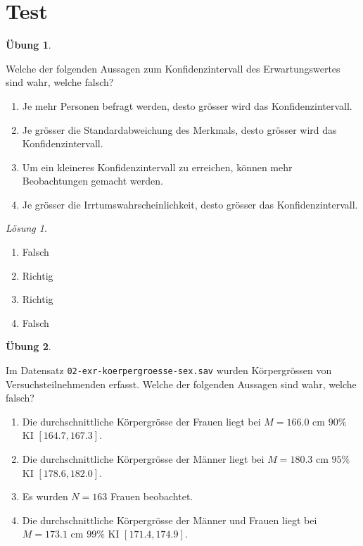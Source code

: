 \documentclass[
]{book}
\providecommand{\tightlist}{%
  \setlength{\itemsep}{0pt}\setlength{\parskip}{0pt}}
\theoremstyle{definition}
\theoremstyle{definition}
\theoremstyle{definition}
\newtheorem{exercise}{Übung}[chapter]
\theoremstyle{definition}
\theoremstyle{remark}
\newtheorem*{solution}{Lösung}
\begin{document}
\section{Test}\label{test-1}

\begin{exercise}
\protect\hypertarget{exr:ki-theory}{}\label{exr:ki-theory}

Welche der folgenden Aussagen zum Konfidenzintervall des Erwartungswertes sind wahr, welche falsch?

\begin{enumerate}
\def\labelenumi{\alph{enumi})}
\tightlist
\item
  Je mehr Personen befragt werden, desto grösser wird das Konfidenzintervall.
\item
  Je grösser die Standardabweichung des Merkmals, desto grösser wird das Konfidenzintervall.
\item
  Um ein kleineres Konfidenzintervall zu erreichen, können mehr Beobachtungen gemacht werden.
\item
  Je grösser die Irrtumswahrscheinlichkeit, desto grösser das Konfidenzintervall.
\end{enumerate}

\end{exercise}

\begin{solution}
\leavevmode

\begin{enumerate}
\def\labelenumi{\alph{enumi})}
\tightlist
\item
  Falsch
\item
  Richtig
\item
  Richtig
\item
  Falsch
\end{enumerate}

\end{solution}

\begin{exercise}
\protect\hypertarget{exr:ki-praxis}{}\label{exr:ki-praxis}

Im Datensatz \texttt{02-exr-koerpergroesse-sex.sav} wurden Körpergrössen von Versuchsteilnehmenden erfasst. Welche der folgenden Aussagen sind wahr, welche falsch?

\begin{enumerate}
\def\labelenumi{\alph{enumi})}
\tightlist
\item
  Die durchschnittliche Körpergrösse der Frauen liegt bei \(M = 166.0\) cm \(90\%\) KI \([164.7, 167.3]\).
\item
  Die durchschnittliche Körpergrösse der Männer liegt bei \(M = 180.3\) cm \(95\%\) KI \([178.6, 182.0]\).
\item
  Es wurden \(N= 163\) Frauen beobachtet.
\item
  Die durchschnittliche Körpergrösse der Männer und Frauen liegt bei \(M = 173.1\) cm \(99\%\) KI \([171.4, 174.9]\).
\end{enumerate}

\end{exercise}
\end{document}
